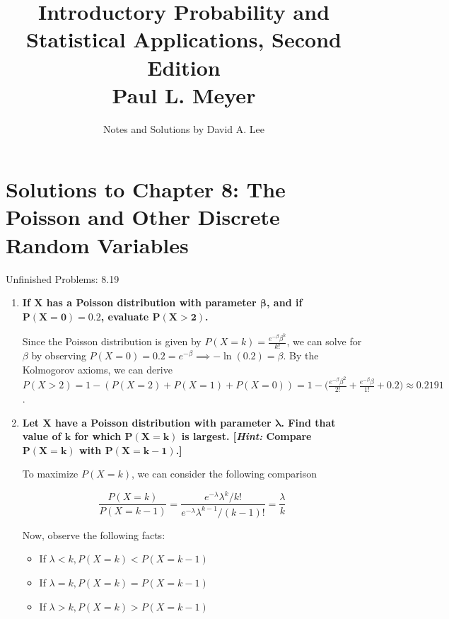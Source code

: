 \documentclass[10pt, oneside]{article}
\title{Introductory Probability and Statistical Applications, Second Edition \\
\large{Paul L. Meyer}}
\author{Notes and Solutions by David A. Lee}
\date{}							%
\begin{document}
\maketitle
\section*{Solutions to Chapter 8: The Poisson and Other Discrete Random Variables}

Unfinished Problems: 8.19

\begin{enumerate}[label=8.\arabic*]
\itemsep0em 
\item  \begin{tcolorbox}[
  colback=Cerulean!5!white,
  colframe=Cerulean!75!black]
\textbf{If $\bm{X}$ has a Poisson distribution with parameter $\bm{\beta}$, and if $\bm{P(X = 0) = 0.2}$, evaluate $\bm{P(X > 2)}$.}
\end{tcolorbox}

Since the Poisson distribution is given by $P(X = k) = \frac{e^{-\beta} \beta^k}{k!}$, we can solve for $\beta$ by observing $P(X = 0) = 0.2 = e^{-\beta} \implies -\ln(0.2) = \beta$. By the Kolmogorov axioms, we can derive $P(X > 2) = 1 - (P(X = 2) + P(X = 1) + P(X = 0)) = 1 - \Big( \frac{e^{-\beta} \beta^2}{2!} + \frac{e^{-\beta} \beta}{1!} + 0.2 \Big) \approx \boxed{0.2191}$.

\item  \begin{tcolorbox}[
  colback=Cerulean!5!white,
  colframe=Cerulean!75!black]
\textbf{Let $\bm{X}$ have a Poisson distribution with parameter $\bm{\lambda}$. Find that value of $\bm{k}$ for which $\bm{P(X = k)}$ is largest. [\textit{Hint:} Compare $\bm{P(X = k)}$ with $\bm{P(X = k - 1)}$.]}
\end{tcolorbox}

To maximize $P(X = k)$, we can consider the following comparison

\[ \frac{P(X = k)}{P(X = k - 1)} = \frac{e^{-\lambda} \lambda^k / k!}{ e^{-\lambda} \lambda^{k-1} / (k-1)!} = \frac{\lambda}{k}\]

Now, observe the following facts:

\begin{itemize}
\item If $\lambda < k, P(X = k) < P(X = k - 1)$
\item If $\lambda = k, P(X = k) = P(X = k - 1)$
\item If $\lambda > k, P(X = k) > P(X = k - 1)$
\end{itemize}


\end{enumerate}
\end{document}
